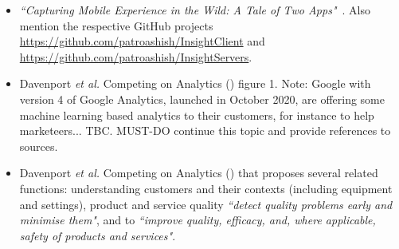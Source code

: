 \begin{itemize}

    \item \emph{``Capturing Mobile Experience in the Wild: A Tale of Two Apps"}~\citep{patro2013_capturing_mobile_experience_in_the_wild}. Also mention the respective GitHub projects \url{https://github.com/patroashish/InsightClient} and \url{https://github.com/patroashish/InsightServers}.

    \item Davenport \textit{et al.} Competing on Analytics (\cite{davenport2017competing_on_analytics}) figure 1. Note: Google with version 4 of Google Analytics, launched in October 2020, are offering some machine learning based analytics to their customers, for instance to help marketeers... TBC. MUST-DO continue this topic and provide references to sources.
    
    \item Davenport \textit{et al.} Competing on Analytics (\cite{davenport2006competing_on_analytics}) that proposes several related functions: understanding customers and their contexts (including equipment and settings), product and service quality \emph{``detect quality problems early and minimise them"}, and to \emph{``improve quality, efficacy, and, where applicable, safety of products and services"}.
    

\end{itemize}
